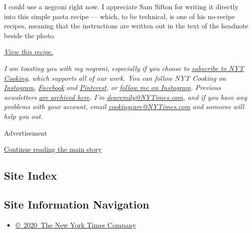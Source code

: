I could use a negroni right now. I appreciate Sam Sifton for writing it
directly into this simple pasta recipe --- which, to be technical, is
one of his no-recipe recipes, meaning that the instructions are written
out in the text of the headnote beside the photo.

\href{https://cooking.nytimes3xbfgragh.onion/recipes/1020019-pasta-with-chickpeas-and-a-negroni}{\emph{View
this recipe.}}

\emph{I am toasting you with my negroni, especially if you choose to}
\href{https://www.nytimes3xbfgragh.onion/subscriptions/Multiproduct/lp8R3WU.html}{\emph{subscribe
to NYT Cooking}}\emph{, which supports all of our work. You can follow
NYT Cooking on}
\href{https://www.instagram.com/nytcooking}{\emph{Instagram}}\emph{,}
\href{https://www.facebookcorewwwi.onion/nytcooking/}{\emph{Facebook}}
\emph{and}
\href{https://www.pinterest.com/nytcooking/}{\emph{Pinterest}}\emph{,
or} \href{https://www.instagram.com/emweinstein}{\emph{follow me on
Instagram}}\emph{. Previous newsletters}
\href{https://www.nytimes3xbfgragh.onion/column/five-weeknight-dishes}{\emph{are
archived here}}\emph{. I'm}
\href{mailto:dearemily@NYTimes.com}{\emph{dearemily@NYTimes.com}}\emph{,
and if you have any problems with your account, email}
\href{mailto:cookingcare@NYTimes.com}{\emph{cookingcare@NYTimes.com}}
\emph{and someone will help you out.}

Advertisement

\protect\hyperlink{after-bottom}{Continue reading the main story}

\hypertarget{site-index}{%
\subsection{Site Index}\label{site-index}}

\hypertarget{site-information-navigation}{%
\subsection{Site Information
Navigation}\label{site-information-navigation}}

\begin{itemize}
\tightlist
\item
  \href{https://help.nytimes3xbfgragh.onion/hc/en-us/articles/115014792127-Copyright-notice}{©~2020~The
  New York Times Company}
\end{itemize}

